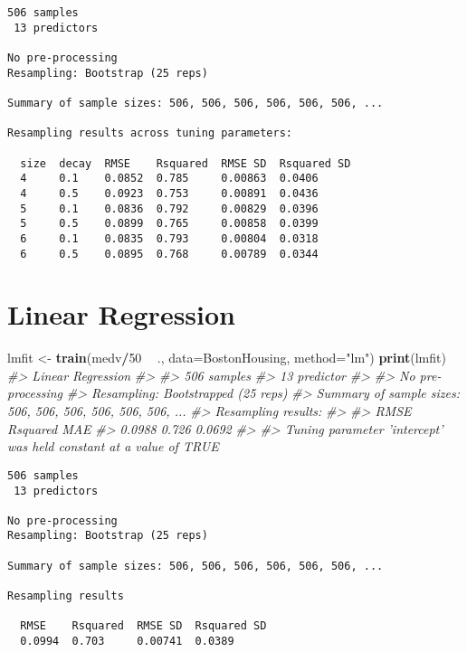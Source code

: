 \documentclass[]{book}
\newenvironment{Shaded}{\begin{snugshade}}{\end{snugshade}}
\newcommand{\CommentTok}[1]{\textcolor[rgb]{0.56,0.35,0.01}{\textit{#1}}}
\newcommand{\DataTypeTok}[1]{\textcolor[rgb]{0.13,0.29,0.53}{#1}}
\newcommand{\DecValTok}[1]{\textcolor[rgb]{0.00,0.00,0.81}{#1}}
\newcommand{\KeywordTok}[1]{\textcolor[rgb]{0.13,0.29,0.53}{\textbf{#1}}}
\newcommand{\NormalTok}[1]{#1}
\newcommand{\OperatorTok}[1]{\textcolor[rgb]{0.81,0.36,0.00}{\textbf{#1}}}
\newcommand{\StringTok}[1]{\textcolor[rgb]{0.31,0.60,0.02}{#1}}
\begin{document}
\begin{verbatim}
506 samples
 13 predictors
 
No pre-processing
Resampling: Bootstrap (25 reps) 
 
Summary of sample sizes: 506, 506, 506, 506, 506, 506, ... 
 
Resampling results across tuning parameters:
 
  size  decay  RMSE    Rsquared  RMSE SD  Rsquared SD
  4     0.1    0.0852  0.785     0.00863  0.0406     
  4     0.5    0.0923  0.753     0.00891  0.0436     
  5     0.1    0.0836  0.792     0.00829  0.0396     
  5     0.5    0.0899  0.765     0.00858  0.0399     
  6     0.1    0.0835  0.793     0.00804  0.0318     
  6     0.5    0.0895  0.768     0.00789  0.0344   
\end{verbatim}

\hypertarget{linear-regression}{%
\section{Linear Regression}\label{linear-regression}}

\begin{Shaded}
\begin{Highlighting}[]
\NormalTok{ lmfit <-}\StringTok{ }\KeywordTok{train}\NormalTok{(medv}\OperatorTok{/}\DecValTok{50} \OperatorTok{~}\StringTok{ }\NormalTok{., }\DataTypeTok{data=}\NormalTok{BostonHousing, }\DataTypeTok{method=}\StringTok{"lm"}\NormalTok{) }
 \KeywordTok{print}\NormalTok{(lmfit)}
\CommentTok{#> Linear Regression }
\CommentTok{#> }
\CommentTok{#> 506 samples}
\CommentTok{#>  13 predictor}
\CommentTok{#> }
\CommentTok{#> No pre-processing}
\CommentTok{#> Resampling: Bootstrapped (25 reps) }
\CommentTok{#> Summary of sample sizes: 506, 506, 506, 506, 506, 506, ... }
\CommentTok{#> Resampling results:}
\CommentTok{#> }
\CommentTok{#>   RMSE    Rsquared  MAE   }
\CommentTok{#>   0.0988  0.726     0.0692}
\CommentTok{#> }
\CommentTok{#> Tuning parameter 'intercept' was held constant at a value of TRUE}
\end{Highlighting}
\end{Shaded}

\begin{verbatim}
506 samples
 13 predictors
 
No pre-processing
Resampling: Bootstrap (25 reps) 
 
Summary of sample sizes: 506, 506, 506, 506, 506, 506, ... 
 
Resampling results
 
  RMSE    Rsquared  RMSE SD  Rsquared SD
  0.0994  0.703     0.00741  0.0389    
\end{verbatim}
\end{document}
